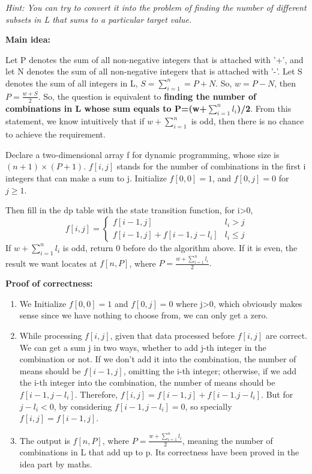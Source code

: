 \documentclass{article}
\begin{document}
\textit{Hint: You can try to convert it into the problem of finding the number of different subsets in L that sums to a particular target value.}

\textbf{Main idea:}

Let P denotes the sum of all non-negative integers that is attached with '+', and let N denotes the sum of all non-negative integers that is attached with '-'.
Let S denotes the sum of all integers in L, $S=\sum_{i=1}^n=P+N$.
So, $w=P-N$, then $P=\frac{w+S}{2}$. So, the question is equivalent to \textbf{finding the number of combinations in L whose sum equals to P=(w+$\sum_{i=1}^nl_i$)/2}.
From this statement, we know intuitively that if $w+\sum_{i=1}^n$ is odd, then there is no chance to achieve the requirement.

Declare a two-dimensional array f for dynamic programming, whose size is $(n+1)\times (P+1)$. $f[i,j]$ stands for the number of combinations in the first i integers that can make a sum to j.
Initialize $f[0,0]=1$, and $f[0,j]=0$ for $j\geq 1$.

Then fill in the dp table with the state transition function, for i>0,
$$f[i,j]=\begin{cases}
		f[i-1,j]              & l_i>j     \\
		f[i-1,j]+f[i-1,j-l_i] & l_i\leq j
	\end{cases}$$
If $w+\sum_{i=1}^nl_i$ is odd, return 0 before do the algorithm above.
If it is even, the result we want locates at $f[n,P]$, where $P=\frac{w+\sum_{i=1}^nl_i}{2}.$

\textbf{Proof of correctness:}
\begin{enumerate}
	\item We Initialize $f[0,0]=1$ and $f[0,j]=0$ where j>0, which obviously makes sense since we have nothing to choose from, we can only get a zero.
	\item While processing $f [i, j]$, given that data processed before $f [i, j]$ are correct. We can get a sum j in two ways, whether to add j-th integer in the combination or not. If we don't add it into the combination, the number of means should be $f[i-1,j]$, omitting the i-th integer; otherwise, if we add the i-th integer into the combination, the number of means should be $f[i-1,j-l_i]$. Therefore, $f[i,j]=f[i-1,j]+f[i-1.j-l_i]$. But for $j-l_i<0$, by considering $f[i-1,j-l_i]=0$, so specially $f[i,j]=f[i-1,j]$.
	\item The output is $f[n,P]$, where $P=\frac{w+\sum_{i=1}^nl_i}{2}$, meaning the number of combinations in L that add up to p. Its correctness have been proved in the idea part by maths.
\end{enumerate}
\end{document}
